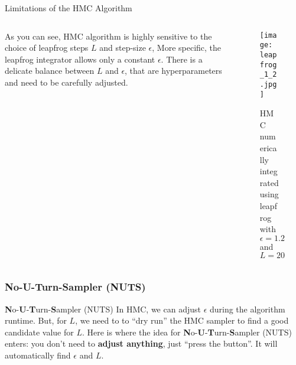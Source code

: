 
\begin{frame}{Limitations of the HMC Algorithm}
	\begin{columns}
		\begin{column}{0.6\textwidth}
			As you can see, HMC algorithm is highly sensitive to the choice of
			leapfrog steps $L$ and step-size $\epsilon$,
			More specific, the leapfrog integrator allows only a constant $\epsilon$.
			There is a delicate balance between $L$ and $\epsilon$,
			that are hyperparameters and need to be carefully adjusted.
		\end{column}
		\begin{column}{0.4\textwidth}
			\begin{figure}
				\texttt{[image: leapfrog\_1\_2.jpg]}
				\caption{HMC numerically integrated using leapfrog with $\epsilon = 1.2$ and $L = 20$}
			\end{figure}
		\end{column}
	\end{columns}
\end{frame}

\subsubsection{No-U-Turn-Sampler (NUTS)}
\begin{frame}{\textbf{N}o-\textbf{U}-\textbf{T}urn-\textbf{S}ampler (NUTS)}
	In HMC, we can adjust $\epsilon$ during the algorithm runtime.
	But, for $L$, we need to to ``dry run'' the HMC sampler to find a good candidate value for $L$.
	\vfill
	Here is where the idea for \textbf{N}o-\textbf{U}-\textbf{T}urn-\textbf{S}ampler (NUTS)
	\parencite{hoffman2014no} enters:
	you don't need to \textbf{adjust anything},
	just ``press the button''.
	It will automatically find $\epsilon$ and $L$.
\end{frame}

